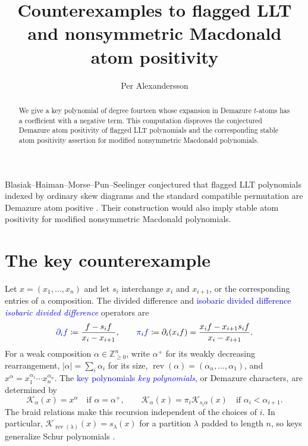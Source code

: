 \documentclass[10pt,reqno]{amsart}
\title[Counterexamples to atom positivity]
{Counterexamples to flagged LLT and nonsymmetric Macdonald atom positivity}
\author{Per Alexandersson}
\date{}
\newcommand{\keyK}{\mathcal{K}}
\newcommand{\defin}[1]{%
  \relax\ifmmode\textcolor{blue}{#1}%
  \else\textcolor{blue}{\emph{#1}}\fi}
\begin{document}
\begin{abstract}
We give a key polynomial of degree fourteen whose expansion in Demazure
$t$-atoms has a coefficient with a negative term.  This computation
disproves the conjectured Demazure atom positivity of flagged LLT
polynomials and the corresponding stable atom positivity assertion for
modified nonsymmetric Macdonald polynomials.
\end{abstract}

\maketitle

Blasiak--Haiman--Morse--Pun--Seelinger conjectured that flagged LLT
polynomials indexed by ordinary skew diagrams and the standard compatible
permutation are Demazure atom positive
\cite[Conjecture~6.6.1]{BlasiakHaimanMorsePunSeelinger2025x}.  Their construction
would also imply stable atom positivity for modified nonsymmetric Macdonald
polynomials.

\section{The key counterexample}

Let $x=(x_1,\dotsc,x_n)$ and let $s_i$ interchange $x_i$ and $x_{i+1}$,
or the corresponding entries of a composition.
The divided difference and \defin{isobaric divided difference} operators are
\[
 \defin{\partial_i f}\coloneqq\frac{f-s_i f}{x_i-x_{i+1}},
 \qquad
 \defin{\pi_i f}\coloneqq\partial_i(x_i f)
 =\frac{x_i f-x_{i+1}s_i f}{x_i-x_{i+1}}.
\]
For a weak composition $\alpha\in\mathbb{Z}_{\geq0}^n$, write $\alpha^+$ for its
weakly decreasing rearrangement, $|\alpha|=\sum_i\alpha_i$ for its size,
$\operatorname{rev}(\alpha)=(\alpha_n,\dotsc,\alpha_1)$, and
$x^\alpha=x_1^{\alpha_1}\dotsm x_n^{\alpha_n}$.
The \defin{key polynomials}, or Demazure characters, are determined by
\[
 \keyK_\alpha(x)=x^\alpha\quad\text{if }\alpha=\alpha^+,
 \qquad
 \keyK_\alpha(x)=\pi_i\keyK_{s_i\alpha}(x)
 \quad\text{if }\alpha_i<\alpha_{i+1}.
\]
The braid relations make this recursion independent of the choices of $i$.
In particular, $\keyK_{\operatorname{rev}(\lambda)}(x)=s_\lambda(x)$ for a
partition $\lambda$ padded to length $n$, so keys generalize Schur polynomials
\cite{Lascoux1990Keys}.
\end{document}
